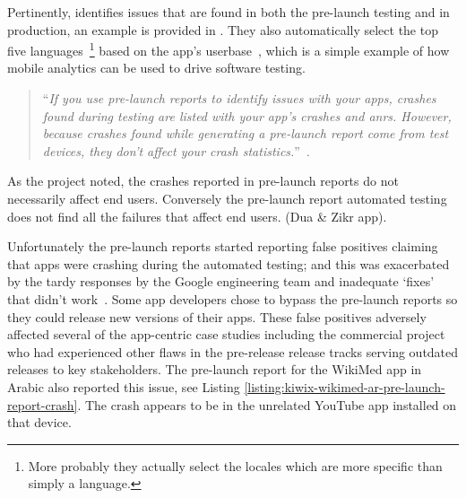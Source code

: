 Pertinently,  identifies issues that are found in both the pre-launch testing and in production, an example is provided in . They also automatically select the top five languages~\footnote{More probably they actually select the locales which are more specific than simply a language.} based on the app's userbase~, which is a simple example of how mobile analytics can be used to drive software testing.

\begin{quote}
``\emph{If you use pre-launch reports to identify issues with your apps, crashes found during testing are listed with your app’s crashes and \Gls{anr}s. However, because crashes found while generating a pre-launch report come from test devices, they don’t affect your crash statistics.}''~.    
\end{quote}

As the  project noted, the crashes reported in pre-launch reports do not necessarily affect end users. Conversely the pre-launch report automated testing does not find all the failures that affect end users. (Dua \& Zikr app).


Unfortunately the pre-launch reports started reporting false positives claiming that apps were crashing during the automated testing; and this was exacerbated by the tardy responses by the Google engineering team and inadequate `fixes' that didn't work~. %
Some app developers chose to bypass the pre-launch reports so they could release new versions of their apps. These false positives adversely affected several of the app-centric case studies including the commercial project who had experienced other flaws in the pre-release release tracks serving outdated releases to key stakeholders. The pre-launch report for the WikiMed app in Arabic also reported this issue, see Listing \ref{listing:kiwix-wikimed-ar-pre-launch-report-crash}. The crash appears to be in the unrelated YouTube app installed on that device. 


